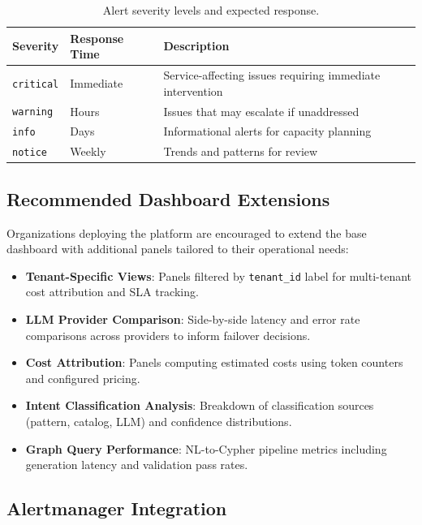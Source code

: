 \begin{table}[ht]
\centering
\caption{Alert severity levels and expected response.}
\label{tab:alert-severity}
\begin{tabular}{llp{8cm}}
\hline
\textbf{Severity} & \textbf{Response Time} & \textbf{Description} \\
\hline
\texttt{critical} & Immediate & Service-affecting issues requiring immediate intervention \\
\texttt{warning} & Hours & Issues that may escalate if unaddressed \\
\texttt{info} & Days & Informational alerts for capacity planning \\
\texttt{notice} & Weekly & Trends and patterns for review \\
\hline
\end{tabular}
\end{table}

\subsection{Recommended Dashboard Extensions}

Organizations deploying the platform are encouraged to extend the base dashboard with additional panels tailored to their operational needs:

\begin{itemize}
    \item \textbf{Tenant-Specific Views}: Panels filtered by \texttt{tenant\_id} label for multi-tenant cost attribution and SLA tracking.
    
    \item \textbf{LLM Provider Comparison}: Side-by-side latency and error rate comparisons across providers to inform failover decisions.
    
    \item \textbf{Cost Attribution}: Panels computing estimated costs using token counters and configured pricing.
    
    \item \textbf{Intent Classification Analysis}: Breakdown of classification sources (pattern, catalog, LLM) and confidence distributions.
    
    \item \textbf{Graph Query Performance}: NL-to-Cypher pipeline metrics including generation latency and validation pass rates.
\end{itemize}

\subsection{Alertmanager Integration}

